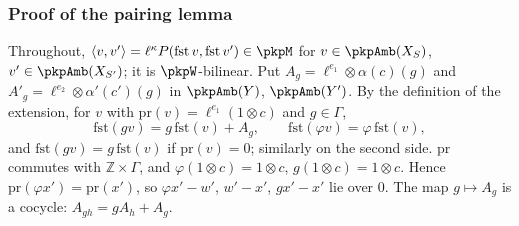 \documentclass[10pt]{amsart}
\theoremstyle{definition}
\theoremstyle{remark}
\newcommand{\Z}{\mathbb Z}
\begin{document}
\subsubsection{Proof of the pairing lemma}\label{pkp:ss-pairing}

Throughout, $\langle v,v'\rangle=\ell^\kappa P(\mathrm{fst}\,v,\mathrm{fst}\,v')\in\pkpM$ for
$v\in\pkpAmb(X_S)$, $v'\in\pkpAmb(X_{S'})$; it is $\pkpW$-bilinear. Put $A_g=\ell^{e_1}\otimes
\alpha(c)(g)$ and $A'_g=\ell^{e_2}\otimes\alpha'(c')(g)$ in $\pkpAmb(Y)$, $\pkpAmb(Y')$. By the
definition of the extension, for $v$ with $\mathrm{pr}(v)=\ell^{e_1}(1\otimes c)$ and $g\in\Gamma$,
\begin{equation}\label{pkp:eq-fst}
\mathrm{fst}(gv)=g\,\mathrm{fst}(v)+A_g,\qquad \mathrm{fst}(\varphi v)=\varphi\,\mathrm{fst}(v),
\end{equation}
and $\mathrm{fst}(gv)=g\,\mathrm{fst}(v)$ if $\mathrm{pr}(v)=0$; similarly on the second side.
$\mathrm{pr}$ commutes with $\Z\times\Gamma$, and $\varphi(1\otimes c)=1\otimes c$, $g(1\otimes
c)=1\otimes c$. Hence $\mathrm{pr}(\varphi x')=\mathrm{pr}(x')$, so $\varphi x'-w'$, $w'-x'$, $gx'-x'$
lie over $0$. The map $g\mapsto A_g$ is a cocycle: $A_{gh}=gA_h+A_g$.
\end{document}
